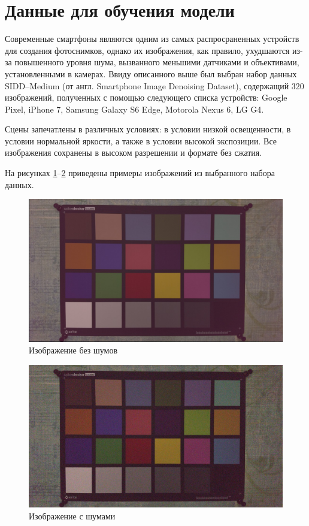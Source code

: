 \section{Данные для обучения модели}

Современные смартфоны являются одним из самых распросраненных устройств для создания фотоснимков, однако их изображения, как правило, ухудшаются из-за повышенного уровня шума, вызванного меньшими датчиками и объективами, установленными в камерах. Ввиду описанного выше был выбран набор данных SIDD--Medium \cite{sidd} (от англ. Smartphone Image Denoising Dataset), содержащий 320 изображений, полученных с помощью следующего списка устройств: Google Pixel, iPhone 7, Samsung Galaxy S6 Edge, Motorola Nexus 6, LG G4.

Сцены запечатлены в различных условиях: в условии низкой освещенности, в условии нормальной яркости, а также в условии высокой экспозиции. Все изображения сохранены в высоком разрешении и формате без сжатия.  

На рисунках \ref{fig:dataset_original}--\ref{fig:dataset_noisy} приведены примеры изображений из выбранного набора данных.

\begin{figure}[h!btp]
	\centering
	\includegraphics[scale = 0.55]{inc/design/dataset/original.jpg}
	\caption{Изображение без шумов}
	\label{fig:dataset_original}	
\end{figure}

\begin{figure}[h!btp]
	\centering
	\includegraphics[scale = 0.55]{inc/design/dataset/noisy.jpg}
	\caption{Изображение с шумами}
	\label{fig:dataset_noisy}	
\end{figure}


